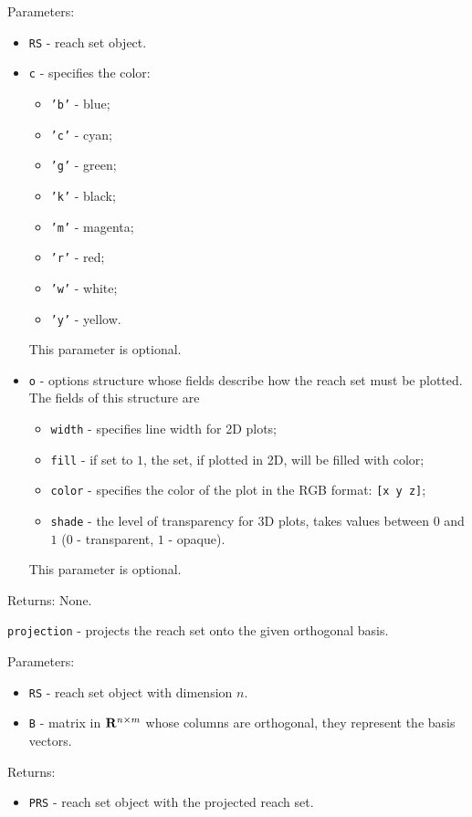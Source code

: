 \documentclass{report}
\begin{document}
Parameters:
\begin{itemize}
\item {\tt RS} - reach set object.
\item {\tt c} - specifies the color:
\begin{itemize}
\item {\tt 'b'} - blue;
\item {\tt 'c'} - cyan;
\item {\tt 'g'} - green;
\item {\tt 'k'} - black;
\item {\tt 'm'} - magenta;
\item {\tt 'r'} - red;
\item {\tt 'w'} - white;
\item {\tt 'y'} - yellow.
\end{itemize}
This parameter is optional.
\item {\tt o} - options structure whose fields describe how the reach set
must be plotted. The fields of this structure are
\begin{itemize}
\item {\tt width} - specifies line width for 2D plots;
\item {\tt fill} - if set to $1$, the set, if plotted in 2D,
will be filled with color;
\item {\tt color} - specifies the color of the plot in the RGB format:
{\tt [x y z]};
\item {\tt shade} - the level of transparency for 3D plots, takes values
between $0$ and $1$ ($0$ - transparent, $1$ - opaque).
\end{itemize}
This parameter is optional.
\end{itemize}

Returns: None.

\newpage

{\Large {\tt projection}} - projects the reach set onto the given orthogonal
basis.

Parameters:
\begin{itemize}
\item {\tt RS} - reach set object with dimension $n$.
\item {\tt B} - matrix in ${\bf R}^{n\times m}$ whose columns are orthogonal,
they represent the basis vectors.
\end{itemize}

Returns:
\begin{itemize}
\item {\tt PRS} - reach set object with the projected reach set.
\end{itemize}
\end{document}
